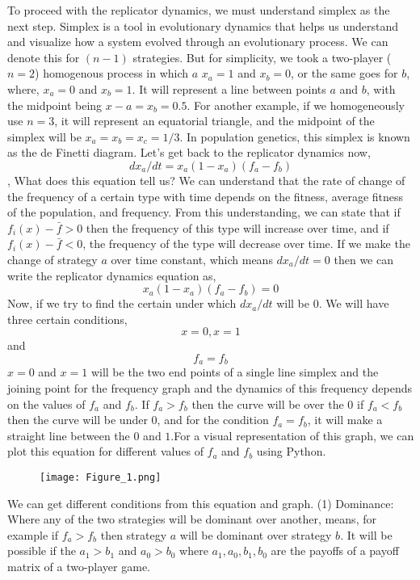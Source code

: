 \documentclass{article}
\begin{document}
To proceed with the replicator dynamics, we must understand simplex as the next step.
Simplex is a tool in evolutionary dynamics that helps us understand and visualize how a system evolved through an evolutionary process. We can denote this for $(n-1)$ strategies. But for simplicity, we took a two-player ($n=2$) homogenous process in which $a$ $x_a=1$ and $x_b=0$, or the same goes for $b$, where, $x_a=0$ and $x_b=1$.
It will represent a line between points $a$ and $b$, with the midpoint being $x-a=x_b=0.5$. 
For another example, if we homogeneously use $ n=3$, it will represent an equatorial triangle, and the midpoint of the simplex will be $x_a=x_b=x_c=1/3$.
In population genetics, this simplex is known as the de Finetti diagram.
Let's get back to the replicator dynamics now,
\[dx_a/dt=x_a(1-x_a)(f_a-f_b)\],
What does this equation tell us? 
We can understand that the rate of change of the frequency of a certain type with time depends on the fitness, average fitness of the population, and frequency. From this understanding, we can state that if $f_i(x)-\bar{f}>0$ then the frequency of this type will increase over time, and if $f_i(x)-\bar{f}<0$, the frequency of the type will decrease over time.
If we make the change of strategy $a$ over time constant, which means $dx_a/dt=0$ then we can write the replicator dynamics equation as,
\[x_a(1-x_a)(f_a-f_b)=0\]
Now, if we try to find the certain under which $dx_a/dt$ will be $0$.
We will have three certain conditions,
\[x=0,x=1\] and \[f_a=f_b\]
$x=0$ and $x=1$ will be the two end points of a single line simplex and the joining point for the frequency graph and the dynamics of this frequency depends on the values of $f_a$ and $f_b$. If $f_a>f_b$ then the curve will be over the $0$ if $f_a<f_b$ then the curve will be under $0$, and for the condition $f_a=f_b$, it will make a straight line between the $0$ and $1$.For a visual representation of this graph, we can plot this equation for different values of $f_a$ and $f_b$ using Python.
\begin{figure}[h]
        \centering
        \texttt{[image: Figure\_1.png]}
        \label{fig:Visualization of $x_a(1-x_a)(f_a-f_b)=0$}
    \end{figure}
We can get different conditions from this equation and graph. 
(1) Dominance: Where any of the two strategies will be dominant over another, means, for example if $f_a>f_b$ then strategy $a$ will be dominant over strategy $b$. It will be possible if the $a_1>b_1$ and $a_0>b_0$ where $a_1,a_0,b_1,b_0$ are the payoffs of a payoff matrix of a two-player game.
\end{document}
